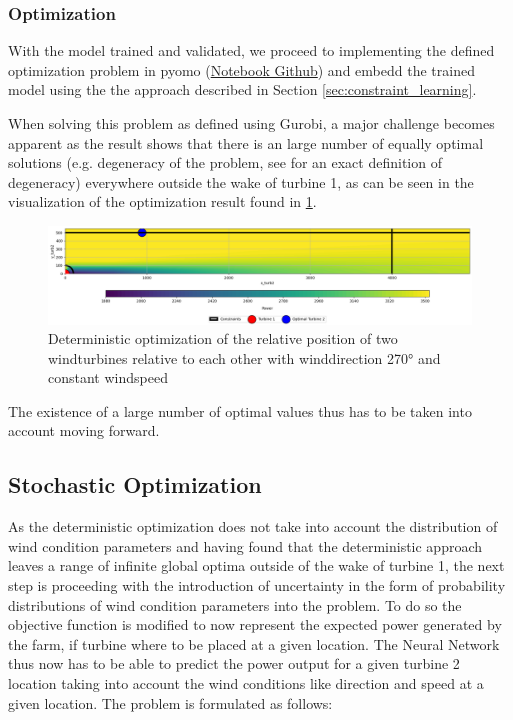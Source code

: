 \subsubsection{Optimization}


With the model trained and validated, we proceed to implementing the defined optimization problem in pyomo  (\href{https://github.com/schmeti/uc3m_TFM_wind_farm_optimization_codebase/blob/main/Windfarm_power_modelling/0_two_turbine_problem_constrLearn_determin.ipynb}{Notebook Github}) and embedd the trained model using the the approach described in Section \ref{sec:constraint_learning}.

When solving this problem as defined using Gurobi, a major challenge becomes apparent as the result shows that there is an large number of equally optimal solutions (e.g. degeneracy of the problem, see  \cite{vanderbei2020chapter3} for an exact definition of degeneracy) everywhere outside the wake of turbine 1, as can be seen  in the visualization of the optimization result found in \ref{fig:two_turbine_heatmap_degeneracy}.


\begin{figure}[h] 
	\centering
	\includegraphics[width=1\textwidth]{figures/optimization/opti_determ270.png} 
	\caption{Deterministic optimization of the relative position of two windturbines relative to each other with winddirection 270° and constant windspeed}
	\label{fig:two_turbine_heatmap_degeneracy}
\end{figure}

The existence of a large number of optimal values thus has to be taken into account moving forward.


\subsection{Stochastic Optimization}

As the deterministic optimization does not take into account the distribution of wind condition parameters and having found that the deterministic approach leaves a range of infinite global optima outside of the wake of turbine 1, the next step is proceeding with the introduction of uncertainty in the form of probability distributions of wind condition parameters into the problem. To do so the objective function is modified to now represent the expected power generated by the farm, if turbine where to be placed at a given location. The Neural Network thus now has to be able to predict the power output for a given turbine 2 location taking into account the wind conditions like direction and speed at a given location. The problem is formulated as follows: 

